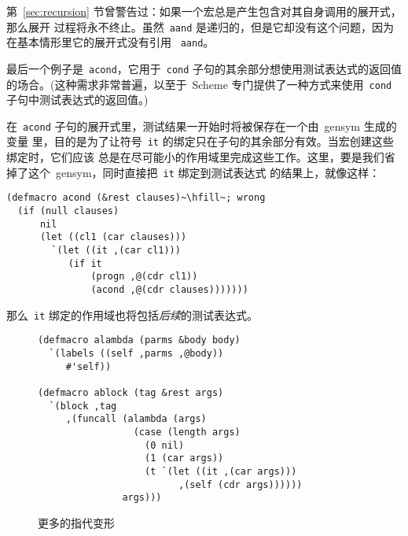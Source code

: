 第~\ref{sec:recursion} 节曾警告过：如果一个宏总是产生包含对其自身调用的展开式，那么展开
过程将永不终止。虽然~\verb|aand| 是递归的，但是它却没有这个问题，因为在基本情形里它的展开式没有引用
~\texttt{aand}。

最后一个例子是~\verb|acond|，它用于~\verb|cond| 子句的其余部分想使用测试表达式的返回值
的场合。(这种需求非常普遍，以至于~Scheme 专门提供了一种方式来使用~\verb|cond|
子句中测试表达式的返回值。)

在~\verb|acond| 子句的展开式里，测试结果一开始时将被保存在一个由~gensym 生成的变量
里，目的是为了让符号~\verb|it| 的绑定只在子句的其余部分有效。当宏创建这些绑定时，它们应该
总是在尽可能小的作用域里完成这些工作。这里，要是我们省掉了这个~gensym，同时直接把~\verb|it| 绑定到测试表达式
的结果上，就像这样：
\begin{lstlisting}[escapechar=\~]
(defmacro acond (&rest clauses)~\hfill~; wrong
  (if (null clauses)
      nil
      (let ((cl1 (car clauses)))
        `(let ((it ,(car cl1)))
           (if it
               (progn ,@(cdr cl1))
               (acond ,@(cdr clauses)))))))
\end{lstlisting}
那么~\texttt{it} 绑定的作用域也将包括\emph{后续}的测试表达式。

\begin{figure}
\begin{lstlisting}
(defmacro alambda (parms &body body)
  `(labels ((self ,parms ,@body))
     #'self))

(defmacro ablock (tag &rest args)
  `(block ,tag
     ,(funcall (alambda (args)
                 (case (length args)
                   (0 nil)
                   (1 (car args))
                   (t `(let ((it ,(car args)))
                         ,(self (cdr args))))))
               args)))
\end{lstlisting}
  \caption{更多的指代变形}
  \label{fig:more_anaphoric_variants}
\end{figure}

